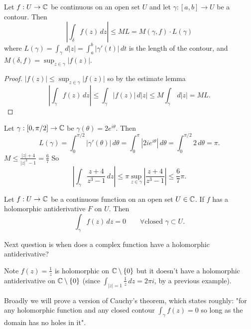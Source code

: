 \documentclass[10pt, a4paper]{article}
\begin{document}
\begin{corollary}[ML inequality]
    Let $f : U \to \mathbb{C}$ be continuous on an open set $U$ and let $\gamma : [a, b] \to U$ be a contour.
    Then
    \[
    \left|\int_{\delta}f(z)\,dz\right| \leq ML = M(\gamma, f)\cdot L(\gamma)
    \]
    where $L(\gamma) = \int_{\gamma}\,d|z| = \int_{a}^{b}|\gamma'(t)|\,dt$ is the length of the contour,
    and $M(\delta, f) = \sup_{z \in \gamma}|f(z)|$.

    \begin{proof}
        $|f(z)| \leq \sup_{z \in \gamma}|f(z)|$ so by the estimate lemma
        \[
        \left|\int_{\gamma}f(z)\,dz\right| \leq \int_{\gamma}|f(z)|\,d|z| \leq M\int_{\gamma}\,d|z| = ML.
        \]
    \end{proof}
\end{corollary}

\begin{example}
    Let $\gamma : [0, \pi / 2] \to \mathbb{C}$ be $\gamma(\theta) = 2e ^ {i\theta}$.
    Then
    \[
    L(\gamma) = \int_{0}^{\pi / 2}|\gamma'(\theta)|\,d\theta = \int_{0}^{\pi}|2ie ^ {i\theta}|\,d\theta = \int_{0}^{\pi / 2}2\,d\theta = \pi.
    \]
    $M \leq \frac{|z| + 4}{|z| ^ 3 - 1} = \frac{6}{7}$
    So
    \[
    \left|\int_{\gamma}\frac{z + 4}{z ^ 3 - 1}\,dz\right| \leq \pi\sup_{z \in \gamma}\left|\frac{z + 4}{z ^ 3 - 1}\right| \leq \frac{6}{7}\pi.
    \]
\end{example}

\begin{theorem}
    Let $f : U \to \mathbb{C}$ be a continuous function on an open set $U \in \mathbb{C}$.
    If $f$ has a holomorphic antiderivative $F$ on $U$.
    Then
    \[
    \int_{\gamma}f(z)\,dz = 0\qquad\forall\text{closed } \gamma \subset U.
    \]
\end{theorem}

Next question is when does a complex function have a holomorphic antiderivative?

Note $f(z) = \frac{1}{z}$ is holomorphic on $\mathbb{C} \setminus \{0\}$ but it doesn't have a holomorphic antiderivative on $\mathbb{C} \setminus \{0\}$
(since $\int_{|z| = 1}\frac{1}{z}\,dz = 2\pi i$,
by a previous example).

Broadly we will prove a version of Cauchy's theorem,
which states roughly:
"for any holomorphic function and any closed contour $\int_{\gamma}f(z) = 0$ so long as the domain has no holes in it".
\end{document}
